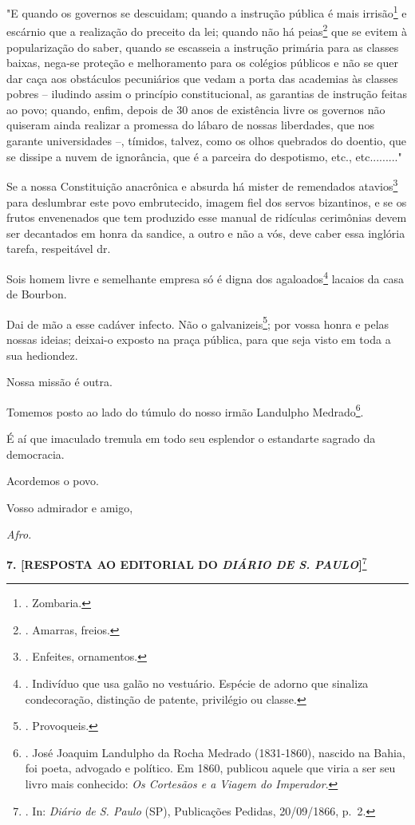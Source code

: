 "E quando os governos se descuidam; quando a instrução pública é mais
irrisão\footnote{. Zombaria.} e escárnio que a realização do preceito da
lei; quando não há peias\footnote{. Amarras, freios.} que se evitem à
popularização do saber, quando se escasseia a instrução primária para as
classes baixas, nega-se proteção e melhoramento para os colégios
públicos e não se quer dar caça aos obstáculos pecuniários que vedam a
porta das academias às classes pobres -- iludindo assim o princípio
constitucional, as garantias de instrução feitas ao povo; quando, enfim,
depois de 30 anos de existência livre os governos não quiseram ainda
realizar a promessa do lábaro de nossas liberdades, que nos garante
universidades --, tímidos, talvez, como os olhos quebrados do doentio,
que se dissipe a nuvem de ignorância, que é a parceira do despotismo,
etc., etc........."

Se a nossa Constituição anacrônica e absurda há mister de remendados
atavios\footnote{. Enfeites, ornamentos.} para deslumbrar este povo
embrutecido, imagem fiel dos servos bizantinos, e se os frutos
envenenados que tem produzido esse manual de ridículas cerimônias devem
ser decantados em honra da sandice, a outro e não a vós, deve caber essa
inglória tarefa, respeitável dr.

Sois homem livre e semelhante empresa só é digna dos
agaloados\footnote{. Indivíduo que usa galão no vestuário. Espécie de
  adorno que sinaliza condecoração, distinção de patente, privilégio ou
  classe.} lacaios da casa de Bourbon.

Dai de mão a esse cadáver infecto. Não o galvanizeis\footnote{.
  Provoqueis.}; por vossa honra e pelas nossas ideias; deixai-o exposto
na praça pública, para que seja visto em toda a sua hediondez.

Nossa missão é outra.

Tomemos posto ao lado do túmulo do nosso irmão Landulpho
Medrado\footnote{. José Joaquim Landulpho da Rocha Medrado (1831-1860),
  nascido na Bahia, foi poeta, advogado e político. Em 1860, publicou
  aquele que viria a ser seu livro mais conhecido: \emph{Os Cortesãos e
  a Viagem do Imperador}.}.

É aí que imaculado tremula em todo seu esplendor o estandarte sagrado da
democracia.

Acordemos o povo.

Vosso admirador e amigo,

\emph{Afro.}

\textbf{7. {[}RESPOSTA AO EDITORIAL DO \emph{DIÁRIO DE S.
PAULO}{]}}\footnote{. In: \emph{Diário de S. Paulo} (SP), Publicações
  Pedidas, 20/09/1866, p.~2.}

